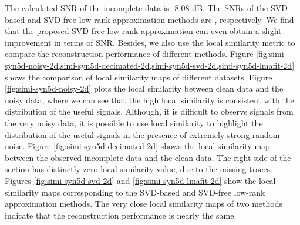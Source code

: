 The calculated SNR of the incomplete data is -8.08 dB. The SNRs of the SVD-based and SVD-free low-rank approximation methods are , respectively. We find that the proposed SVD-free low-rank approximation can even obtain a slight improvement in terms of SNR. Besides, we also use the local similarity metric \cite{yangkang2015ortho} to compare the reconstruction performance of different methods. Figure \ref{fig:simi-syn5d-noisy-2d,simi-syn5d-decimated-2d,simi-syn5d-svd-2d,simi-syn5d-lmafit-2d} shows the comparison of local similarity maps of different datasets. Figure \ref{fig:simi-syn5d-noisy-2d} plots the local similarity between clean data and the noisy data, where we can see that the high local similarity is consistent with the distribution of the useful signals. Although, it is difficult to observe signals from the very noisy data, it is possible to use local similarity to highlight the distribution of the useful signals in the presence of extremely strong random noise. Figure \ref{fig:simi-syn5d-decimated-2d} shows the local similarity map between the observed incomplete data and the clean data. The right side of the section has distinctly zero local similarity value, due to the missing traces. Figures \ref{fig:simi-syn5d-svd-2d} and \ref{fig:simi-syn5d-lmafit-2d} show the local similarity maps corresponding to the SVD-based and SVD-free low-rank approximation methods. The very close local similarity maps of two methods indicate that the reconstruction performance is nearly the same. 




